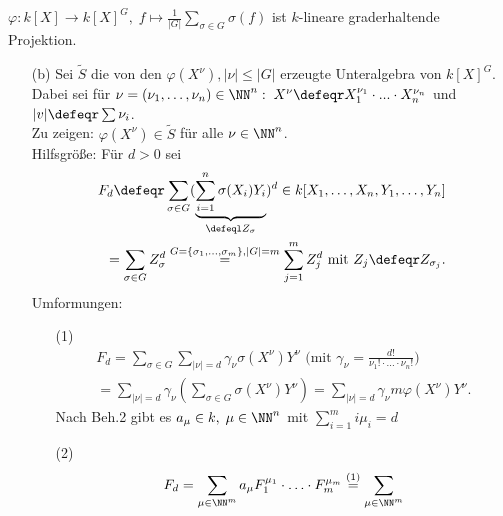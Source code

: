 \begin{nnBem}
  $\varphi: k[X] \to k[X]^G, \; f \mapsto \frac{1}{|G|}\sum_{\sigma \in G} 
  \sigma(f)$ ist $k$-lineare graderhaltende Projektion.
\end{nnBem}

\begin{Bew}
  \begin{enumerate}
    \item[(b)] Sei $\tilde{S}$ die von den $\varphi(X^{\nu}), |\nu| \le |G|$
    erzeugte Unteralgebra von $k[X]^G$.
    Dabei sei für $\nu = ( \nu_1, \dots, \nu_n) \in \NN^n: \; X^{\nu}
    \defeqr X_1^{\nu_1} \cdot ... \cdot X_n^{\nu_n}$ und $|v| \defeqr \sum
    \nu_i$.\\
    Zu zeigen: $\varphi(X^{\nu}) \in \tilde{S}$ für alle $\nu \in
    \NN^n$.\\
    Hilfsgröße: Für $d > 0$ sei
    \begin{equation*}
    \begin{split}
    F_d \defeqr \sum_{\sigma \in
    G}(\underset{\defeql Z_{\sigma}}{\underbrace{\sum_{i=1}^n
    \sigma(X_i)Y_i}})^d \in k[X_1, \dots, X_n, Y_1, \dots, Y_n] \\ 
    = \sum_{\sigma \in G} Z_{\sigma}^d \overset{G=\{\sigma_1, \dots, \sigma_m
    \},|G| = m}{=} \sum_{j=1}^m Z_j^d\text{ mit }Z_j \defeqr Z_{\sigma_j}.
    \end{split}
    \end{equation*}
    Umformungen:
    \begin{enumerate}
      \item[(1)]
      \begin{equation*}
      \begin{split}
      F_d = \sum_{\sigma \in G} \sum_{|\nu|=d} \gamma_{\nu}
      \sigma(X^{\nu})Y^{\nu}\text{ (mit }\gamma_{\nu} = \frac{d!}{\nu_1! \cdot
      ... \cdot \nu_n! })\\
      = \sum_{|\nu| = d} \gamma_{\nu}(\sum_{\sigma \in G}
      \sigma(X^{\nu})Y^{\nu})
      = \sum_{|\nu| = d} \gamma_{\nu} m \varphi(X^{\nu}) Y^{\nu}.
      \end{split}
      \end{equation*}
      Nach Beh.2 gibt es $a_\mu \in k, \; \mu \in \NN^n$ mit $\sum_{i=1}^m
      i \mu_i = d$
      \item[(2)] 
      \begin{equation*}
      \begin{split}
      F_d = \sum_{\mu \in \NN^m} a_{\mu} F_1^{\mu_1} \cdot
      \ldots \cdot F_m^{\mu_m}
      \overset{(1)}{=} \sum_{\mu \in \NN^m}

\end{split}
\end{equation*}
\end{enumerate}
\end{enumerate}
\end{Bew}

